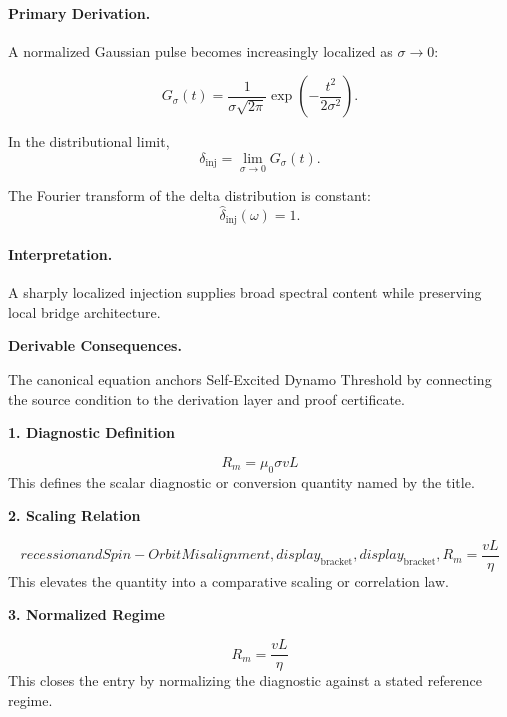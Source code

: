 \paragraph{Primary Derivation.}
A normalized Gaussian pulse becomes increasingly localized as $\sigma\to0$:

\begin{equation}
G_{\sigma}(t)
=
\frac{1}{\sigma\sqrt{2\pi}}
\exp\left(
-\frac{t^2}{2\sigma^2}
\right).
\end{equation}

In the distributional limit,
\begin{equation}
\delta_{\mathrm{inj}}
=
\lim_{\sigma\to0}G_{\sigma}(t).
\end{equation}

The Fourier transform of the delta distribution is constant:
\begin{equation}
\boxed{
\widehat{\delta}_{\mathrm{inj}}(\omega)=1.
}
\end{equation}

\paragraph{Interpretation.}
A sharply localized injection supplies broad spectral content while preserving local bridge architecture.

\par\vspace{0.35em}
\noindent\textbf{Derivable Consequences.}\quad
\begingroup
\footnotesize
\raggedright
The canonical equation anchors Self-Excited Dynamo Threshold by connecting the source condition to the derivation layer and proof certificate.
\par\endgroup

\noindent\textbf{1. Diagnostic Definition}\par
\[
R_m=\mu_0\sigma vL
\]
\noindent This defines the scalar diagnostic or conversion quantity named by the title.\par
\noindent\textbf{2. Scaling Relation}\par
\[
recession and Spin-Orbit Misalignment,display_{\mathrm{bracket}},display_{\mathrm{bracket}},R_m=\frac{vL}{\eta}
\]
\noindent This elevates the quantity into a comparative scaling or correlation law.\par
\noindent\textbf{3. Normalized Regime}\par
\[
R_m=\frac{vL}{\eta}
\]
\noindent This closes the entry by normalizing the diagnostic against a stated reference regime.\par

